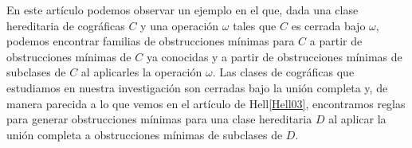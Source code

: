 En este artículo podemos observar un ejemplo en el que, dada una clase hereditaria de cográficas $C$ y una operación $\omega$ tales que $C$ es cerrada bajo $\omega$, podemos encontrar familias de obstrucciones mínimas para $C$ a partir de obstrucciones mínimas de $C$ ya conocidas y a partir de obstrucciones mínimas de subclases de $C$ al aplicarles la operación $\omega$. Las clases de cográficas que estudiamos en nuestra investigación son cerradas bajo la unión completa y, de manera parecida a lo que vemos en el artículo de Hell\ref{Hell03}, encontramos reglas para generar obstrucciones mínimas para una clase hereditaria $D$ al aplicar la unión completa a obstrucciones mínimas de subclases de $D$.
